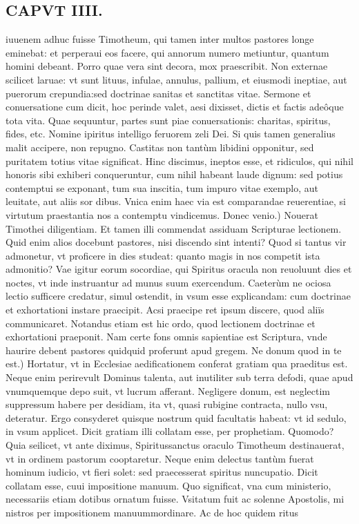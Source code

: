 \documentclass{article}
\begin{document}
\begin{pages}
\section*{CAPVT IIII. }
\marginpar{[ p.53 ]}\pstart iuuenem adhuc fuisse Timotheum, qui tamen inter multos pastores longe eminebat: et perperaui eos facere, qui annorum numero metiuntur, quantum homini debeant. Porro quae vera sint decora, mox praescribit. Non externae scilicet laruae: vt sunt lituus, infulae, annulus, pallium, et eiusmodi ineptiae, aut puerorum crepundia:sed doctrinae sanitas et sanctitas vitae. Sermone et conuersatione cum dicit, hoc perinde valet, aesi dixisset, dictis et factis adeôque tota vita. Quae sequuntur, partes sunt piae conuersationis: charitas, spiritus, fides, etc. Nomine ipiritus intelligo feruorem zeli Dei. Si quis tamen generalius malit accipere, non repugno. Castitas non tantùm libidini opponitur, sed puritatem totius vitae significat. Hinc discimus, ineptos esse, et ridiculos, qui nihil honoris sibi exhiberi conqueruntur, cum nihil habeant laude dignum: sed potius contemptui se exponant, tum sua inscitia, tum impuro vitae exemplo, aut leuitate, aut aliis sor dibus. Vnica enim haec via est comparandae reuerentiae, si virtutum praestantia nos a contemptu vindicemus.  \pend\pstart Donec venio.) Nouerat Timothei diligentiam. Et tamen illi commendat assiduam Scripturae lectionem. Quid enim alios docebunt pastores, nisi discendo sint intenti? Quod si tantus vir admonetur, vt proficere in dies studeat: quanto magis in nos competit ista admonitio? Vae igitur eorum socordiae, qui Spiritus oracula non reuoluunt dies et noctes, vt inde instruantur ad munus suum exercendum. Caeterùm ne ociosa lectio sufficere credatur, simul ostendit, in vsum esse explicandam: cum doctrinae et exhortationi instare praecipit. Acsi praecipe ret ipsum discere, quod aliïs communicaret. Notandus etiam est hic ordo, quod lectionem doctrinae et exhortationi praeponit. Nam certe fons omnis sapientiae est Scriptura, vnde haurire debent pastores quidquid proferunt apud gregem.  \pend\pstart Ne donum quod in te est.) Hortatur, vt in Ecclesiae aedificationem conferat gratiam qua praeditus est. Neque enim perirevult Dominus talenta, aut inutiliter sub terra defodi, quae apud vnumquemque depo suit, vt lucrum afferant. Negligere donum, est neglectim suppressum habere per desidiam, ita vt, quasi rubigine contracta, nullo vsu, deteratur. Ergo consyderet quisque nostrum quid facultatis habeat: vt id sedulo, in vsum applicet. Dicit gratiam illi collatam esse, per prophetiam. Quomodo? Quia seilicet, vt ante diximus, Spiritussanctus oraculo Timotheum destinauerat, vt in ordinem pastorum cooptaretur. Neque enim delectus tantùm fuerat hominum iudicio, vt fieri solet: sed praecesserat spiritus nuncupatio. Dicit collatam esse, cuui impositione manuum. Quo significat, vna cum ministerio, necessariis etiam dotibus ornatum fuisse. Vsitatum fuit ac solenne Apostolis, mi nistros per impositionem manuummordinare. Ac de hoc quidem ritus  \pend

\end{pages}
\end{document}
